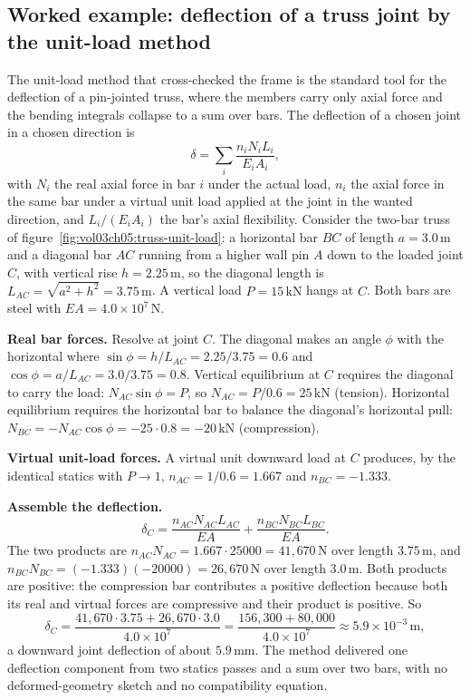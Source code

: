 \subsection{Worked example: deflection of a truss joint by the unit-load
method}

The unit-load method that cross-checked the frame is the standard tool
for the deflection of a pin-jointed truss, where the members carry only
axial force and the bending integrals collapse to a sum over bars. The
deflection of a chosen joint in a chosen direction is
\[
\delta = \sum_i \frac{n_i N_i L_i}{E_i A_i},
\]
with $N_i$ the real axial force in bar $i$ under the actual load, $n_i$
the axial force in the same bar under a virtual unit load applied at the
joint in the wanted direction, and $L_i/(E_i A_i)$ the bar's axial
flexibility. Consider the two-bar truss of
figure~\ref{fig:vol03ch05:truss-unit-load}: a horizontal bar $BC$ of
length $a = 3.0\,\si{\meter}$ and a diagonal bar $AC$ running from a
higher wall pin $A$ down to the loaded joint $C$, with vertical rise
$h = 2.25\,\si{\meter}$, so the diagonal length is $L_{AC} =
\sqrt{a^2 + h^2} = 3.75\,\si{\meter}$. A vertical load $P =
15\,\si{\kilo\newton}$ hangs at $C$. Both bars are steel with
$EA = 4.0\times 10^{7}\,\si{\newton}$.



\textbf{Real bar forces.} Resolve at joint $C$. The diagonal makes an
angle $\phi$ with the horizontal where $\sin\phi = h/L_{AC} = 2.25/3.75 =
0.6$ and $\cos\phi = a/L_{AC} = 3.0/3.75 = 0.8$. Vertical equilibrium at
$C$ requires the diagonal to carry the load: $N_{AC}\sin\phi = P$, so
$N_{AC} = P/0.6 = 25\,\si{\kilo\newton}$ (tension). Horizontal
equilibrium requires the horizontal bar to balance the diagonal's
horizontal pull: $N_{BC} = -N_{AC}\cos\phi = -25\cdot 0.8 =
-20\,\si{\kilo\newton}$ (compression).

\textbf{Virtual unit-load forces.} A virtual unit downward load at $C$
produces, by the identical statics with $P \to 1$, $n_{AC} = 1/0.6 =
1.667$ and $n_{BC} = -1.333$.

\textbf{Assemble the deflection.}
\[
\delta_C = \frac{n_{AC} N_{AC} L_{AC}}{EA}
         + \frac{n_{BC} N_{BC} L_{BC}}{EA}.
\]
The two products are $n_{AC}N_{AC} = 1.667\cdot 25000 = 41{,}670\,
\si{\newton}$ over length $3.75\,\si{\meter}$, and $n_{BC}N_{BC} =
(-1.333)(-20000) = 26{,}670\,\si{\newton}$ over length
$3.0\,\si{\meter}$. Both products are positive: the compression bar
contributes a positive deflection because both its real and virtual
forces are compressive and their product is positive. So
\[
\delta_C = \frac{41{,}670 \cdot 3.75 + 26{,}670 \cdot 3.0}
                {4.0\times 10^{7}}
= \frac{156{,}300 + 80{,}000}{4.0\times 10^{7}}
\approx 5.9\times 10^{-3}\,\si{\meter},
\]
a downward joint deflection of about $5.9\,\si{\milli\meter}$. The method
delivered one deflection component from two statics passes and a sum over
two bars, with no deformed-geometry sketch and no compatibility equation.


